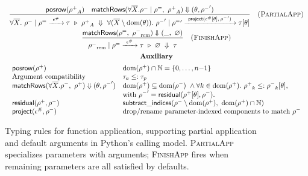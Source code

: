 \begin{figure*}[t]
\centering
\[
\begin{array}{c}
\displaystyle
\frac{
  \mathsf{posrow}(\rpos_A) \quad
  \mathsf{matchRows}(\forall\overline{X}.\rneg \mid \rdef,\ \rpos_A) \Downarrow (\theta, \rneg')
}{
  \forall\overline{X}.~\rneg \mid \rdef \xrightarrow{\ \epsilon^\#\ } \tau
  \ \triangleright\ 
  \rpos_A
  \ \Downarrow\
  \forall(\overline{X}\setminus\mathrm{dom}(\theta)).~
  \rneg' \mid \rdef'
  \xrightarrow{\ \mathsf{project}(\epsilon^\#[\theta],\,\rneg')\ }
  \tau[\theta]
}
\quad \textsc{(PartialApp)}
\\[1.5em]

\displaystyle
\frac{
  \mathsf{matchRows}(\rdef,\ \rneg_{\mathrm{rem}}) \Downarrow (\_,\ \varnothing)
}{
  \rneg_{\mathrm{rem}} \mid \rdef \xrightarrow{\ \epsilon^\#\ } \tau \ \triangleright\ \varnothing \ \Downarrow\ \tau
}
\quad \textsc{(FinishApp)}
\\[1.5em]

\textbf{Auxiliary} \\[0.5em]
\begin{array}{ll}
\mathsf{posrow}(\rpos) & \mathrm{dom}(\rpos)\cap\mathbb{N}=\{0,\dots,n{-}1\} \\
\text{Argument compatibility} & \tau_a \leq: \tau_p \\
\mathsf{matchRows}(\forall\overline{X}.\rneg,\ \rpos)\Downarrow(\theta,\rneg') &
\begin{array}[t]{@{}l@{}}
\mathrm{dom}(\rpos) \subseteq \mathrm{dom}(\rneg)\ \wedge \forall k\in\mathrm{dom}(\rpos).\ \rpos_k \leq: \rneg_k[\theta],\ \\
\text{with }\rneg' = \mathsf{residual}(\rpos[\theta],\rneg).
\end{array}
\\
\mathsf{residual}(\rpos,\rneg) & \mathsf{subtract\_indices}(\rneg \setminus \mathrm{dom}(\rpos),\ \mathrm{dom}(\rpos)\cap\mathbb{N}) \\
\mathsf{project}(\epsilon^\#,\rneg) & \text{drop/rename parameter-indexed components to match }\rneg \\
\end{array}
\end{array}
\]
\caption{Typing rules for function application, supporting partial application and default arguments in Python’s calling model. \textsc{PartialApp} specializes parameters with arguments; \textsc{FinishApp} fires when remaining parameters are all satisfied by defaults.}
\label{fig:app-rules}
\end{figure*}

